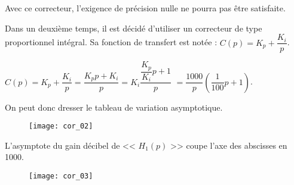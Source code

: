 %
%


\ifprof
\begin{corrige}
Avec ce correcteur, l'exigence de précision nulle ne pourra pas être satisfaite.
\end{corrige}
\else
\fi

\ifprof
\else

Dans un deuxième temps, il est décidé d’utiliser un correcteur de type proportionnel intégral. Sa fonction de transfert est notée : $C(p)=K_p+\dfrac{K_i}{p}$.
\fi

%
%

\ifprof
\begin{corrige}

$C(p)=K_p+\dfrac{K_i}{p}=\dfrac{K_p p + K_i}{p} = K_i \dfrac{\dfrac{K_p}{K_i} p +1 }{p}$
$=\dfrac{1000}{p}\left(\dfrac{1}{100}p+1\right)$. 

On peut donc dresser le tableau de variation asymptotique.

\begin{figure}[H]
\centering
\texttt{[image: cor\_02]}
\end{figure}

L'asymptote du gain décibel de << $H_1(p)$ >> coupe l'axe des abscisses en 1000.

\begin{figure}[H]
\centering
\texttt{[image: cor\_03]}
\end{figure}


\end{corrige}
\else
\fi



